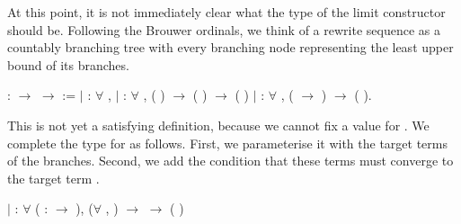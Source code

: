 At this point, it is not immediately clear what the type of the limit
constructor should be. Following the Brouwer ordinals, we think of a rewrite
sequence as a countably branching tree with every branching node representing
the least upper bound of its branches.
\begin{singlespace}
\begin{coqdoccode}
\coqdocnoindent
{}
 :
 \ensuremath{\rightarrow}
 \ensuremath{\rightarrow}
 :=\coqdoceol
\coqdocindent{1.00em}
\ensuremath{|}  :
\ensuremath{\forall} , 
\coqdoceol \coqdocindent{1.00em}
\ensuremath{|}  :
\ensuremath{\forall}   , (
 )
$\rightarrow$
( 
) $\rightarrow$ (
)\coqdoceol \coqdocindent{1.00em}
\ensuremath{|}    :
\ensuremath{\forall}  ,
(
\ensuremath{\rightarrow} 
) $\rightarrow$
(
).\coqdoceol
\end{coqdoccode}
\end{singlespace}
This is not yet a satisfying definition, because we cannot fix a value for
. We complete the type for
 as follows. First, we
parameterise it with the target terms of the branches. Second, we add the
condition that these terms must converge to the target term
.
\begin{singlespace}
\begin{coqdoccode}
\coqdocindent{1.00em}\label{coq:lim}
\ensuremath{|}  :
\ensuremath{\forall}  
( :
\ensuremath{\rightarrow} ),
(\ensuremath{\forall} , 
 ) $\rightarrow$
 
 $\rightarrow$
(
)\coqdoceol
\end{coqdoccode}
\end{singlespace}

